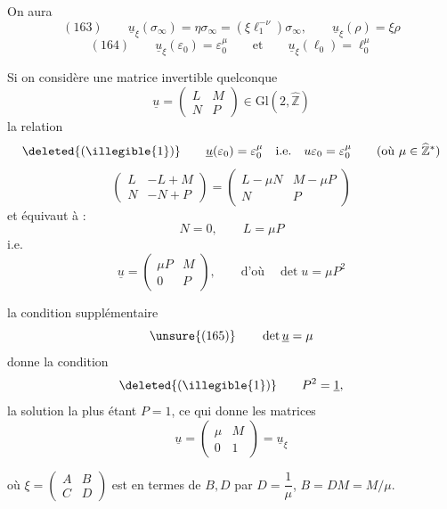 
 On aura
\[
(163)\qquad
\underline u_\xi(\sigma_\infty)
=\eta\sigma_\infty
=(\xi \ell_1^{-\nu})\sigma_\infty,
\qquad
\underline u_\xi(\rho)=\xi\rho
\]
\[
(164)\qquad
\underline u_\xi(\varepsilon_0)=\varepsilon_0^\mu
\qquad\text{et}\qquad
\underline u_\xi(\ell_0)=\ell_0^\mu
\]


Si on considère une matrice invertible quelconque
\[
\underline u=\begin{pmatrix}L&M\\N&P\end{pmatrix}
\in\mathrm{Gl}(2,\widehat{\mathbb Z})
\]
la relation
\[
\deleted{(\illegible{1})}\qquad
\underline u(\varepsilon_0)=\varepsilon_0^\mu
\quad\text{i.e.}\quad
u\varepsilon_0=\varepsilon_0^\mu
\qquad(\text{où }\mu\in\widehat{\mathbb Z}^{*})
\]
\[
\begin{pmatrix}L&-L+M\\N&-N+P\end{pmatrix}
=\begin{pmatrix}L-\mu N&M-\mu P\\N&P\end{pmatrix}
\]
et équivaut à : 
\[
N=0,\qquad L=\mu P
\]
i.e.
\[
\underline u=\begin{pmatrix}\mu P&M\\0&P\end{pmatrix},
\qquad\text{d'où}\quad\det u=\mu P^2
\]

la condition supplémentaire
\[
\unsure{(165)}\qquad \det\underline u=\mu
\]
donne la condition
\[
\deleted{(\illegible{1})}\qquad P^2=\underline 1,
\]
la solution la plus  étant $P=1$,
ce qui donne  les matrices
\[
\underline u=\begin{pmatrix}\mu&M\\0&1\end{pmatrix}
=\underline u_\xi
\]


où $\xi=\begin{pmatrix}A&B\\C&D\end{pmatrix}$
 est  en termes de
$B,D$ par $D=\dfrac1\mu$, $B=DM=M/\mu$.

